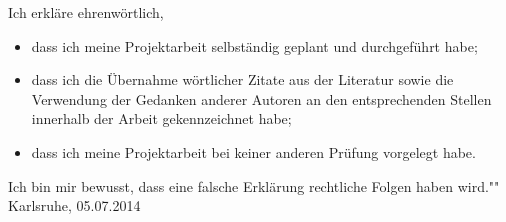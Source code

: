 \documentclass{article}
\begin{document}
Ich erkläre ehrenwörtlich,
\begin{itemize}
    \item dass ich meine Projektarbeit selbständig geplant und durchgeführt habe;
    \item dass ich die Übernahme wörtlicher Zitate aus der Literatur sowie die Verwendung der Gedanken anderer Autoren an den entsprechenden Stellen innerhalb der Arbeit gekennzeichnet habe;
    \item dass ich meine Projektarbeit bei keiner anderen Prüfung
    vorgelegt habe.
\end{itemize}
Ich bin mir bewusst, dass eine falsche Erklärung rechtliche Folgen haben wird."" \\

\vspace{1cm}
Karlsruhe, 05.07.2014 
\end{document}
